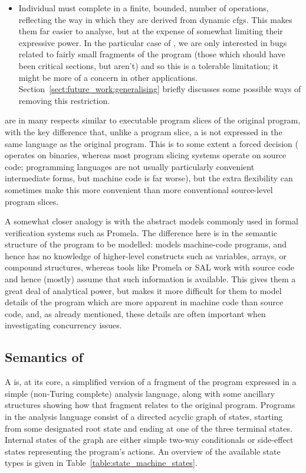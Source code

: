 \begin{itemize}
\item
  Individual {\StateMachines} must complete in a finite, bounded,
  number of operations, reflecting the way in which they are derived
  from dynamic \glspl{cfg}.  This makes them far easier to analyse,
  but at the expense of somewhat limiting their expressive power.  In
  the particular case of {\technique}, we are only interested in bugs
  related to fairly small fragments of the program (those which should
  have been critical sections, but aren't) and so this is a tolerable
  limitation; it might be more of a concern in other applications.
  Section~\ref{sect:future_work:generalising} briefly discusses some
  possible ways of removing this restriction.
\end{itemize}

{\STateMachines} are in many respects similar to executable program
slices of the original program, with the key difference that, unlike a
program slice, a {\StateMachine} is not expressed in the same language
as the original program.  This is to some extent a forced decision
({\technique} operates on binaries, whereas most program slicing
systems operate on source code; programming languages are not usually
particularly convenient intermediate forms, but machine code is far
worse), but the extra flexibility can sometimes make this more
convenient than more conventional source-level program slices.

A somewhat closer analogy is with the abstract models commonly used in
formal verification systems such as Promela\cite{Holzmann1991}.  The
difference here is in the semantic structure of the program to be
modelled: {\technique} models machine-code programs, and hence has no
knowledge of higher-level constructs such as variables, arrays, or
compound structures, whereas tools like Promela or
SAL\cite{Howard2006} work with source code and hence
(mostly) assume
that such information is available.  This gives them a great deal of
analytical power, but makes it more difficult for them to model
details of the program which are more apparent in machine code than
source code, and, as already mentioned, these details are often
important when investigating concurrency issues.

\subsection{Semantics of {\StateMachines}}

A {\StateMachine} is, at its core, a simplified version of a fragment
of the program expressed in a simple (non-Turing complete) analysis
language, along with some ancillary structures showing how that
fragment relates to the original program.  Programs in the analysis
language consist of a directed acyclic graph of states, starting from
some designated root state and ending at one of the three terminal
states.  Internal states of the graph are either simple two-way
conditionals or side-effect states representing the program's actions.
An overview of the available state types is given in
Table~\ref{table:state_machine_states}.

